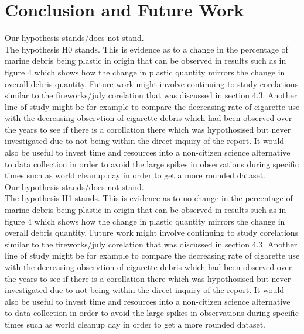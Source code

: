 \documentclass[10pt]{article}\usepackage[]{graphicx}\usepackage[]{color}
\begin{document}
\section{Conclusion and Future Work}\label{cdsmote1}

Our hypothesis stands/does not stand.\\
The hypothesis H0 stands. This is evidence as to a change in the percentage of marine debris being plastic in origin that can be observed in results such as in figure 4 which shows how the change in plastic quantity mirrors the change in overall debris quantity.  
Future work might involve continuing to study corelations similar to the fireworks/july corelation that was discussed in section 4.3. Another line of study might be for example to compare the decreasing rate of cigarette use with the decreasing observtion of cigarette debris which had been observed over the years to see if there is a corollation there which was hypothosised but never investigated due to not being within the direct inquiry of the report. It would also be useful to invest time and resources into a non-citizen science alternative to data collection in order to avoid the large spikes in observations during specific times such as world cleanup day in order to get a more rounded dataset.   \\  

Our hypothesis stands/does not stand.\\
The hypothesis H1 stands. This is evidence as to no change in the percentage of marine debris being plastic in origin that can be observed in results such as in figure 4 which shows how the change in plastic quantity mirrors the change in overall debris quantity.  
Future work might involve continuing to study corelations similar to the fireworks/july corelation that was discussed in section 4.3. Another line of study might be for example to compare the decreasing rate of cigarette use with the decreasing observtion of cigarette debris which had been observed over the years to see if there is a corollation there which was hypothosised but never investigated due to not being within the direct inquiry of the report. It would also be useful to invest time and resources into a non-citizen science alternative to data collection in order to avoid the large spikes in observations during specific times such as world cleanup day in order to get a more rounded dataset.\\     
\end{document}
